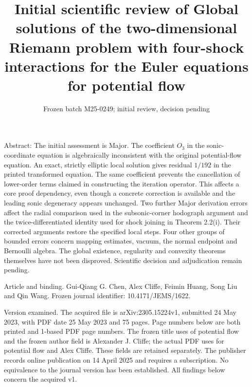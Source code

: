 \documentclass[10pt]{article}
\title{Initial scientific review of
Global solutions of the two-dimensional Riemann problem with four-shock interactions for the Euler equations for potential flow}
\author{}
\date{Frozen batch M25-0249; initial review, decision pending}
\begin{document}
\maketitle
Abstract: The initial assessment is Major. The coefficient \(O_3\) in the sonic-coordinate equation is algebraically inconsistent with the original potential-flow equation. An exact, strictly elliptic local solution gives residual \(1/192\) in the printed transformed equation. The same coefficient prevents the cancellation of lower-order terms claimed in constructing the iteration operator. This affects a core proof dependency, even though a concrete correction is available and the leading sonic degeneracy appears unchanged. Two further Major derivation errors affect the radial comparison used in the subsonic-corner hodograph argument and the twice-differentiated identity used for shock joining in Theorem 2.2(i). Their corrected arguments restore the specified local steps. Four other groups of bounded errors concern mapping estimates, vacuum, the normal endpoint and Bernoulli algebra. The global existence, regularity and convexity theorems themselves have not been disproved. Scientific decision and adjudication remain pending.\par
Article and binding. Gui-Qiang G. Chen, Alex Cliffe, Feimin Huang, Song Liu and Qin Wang. Frozen journal identifier: 10.4171/JEMS/1622.\par
Version examined. The acquired file is arXiv:2305.15224v1, submitted 24 May 2023, with PDF date 25 May 2023 and 75 pages. Page numbers below are both printed and 1-based PDF page numbers. The frozen title uses of potential flow and the frozen author field is Alexander J. Cliffe; the actual PDF uses for potential flow and Alex Cliffe. These fields are retained separately. The publisher records online publication on 14 April 2025 and requires a subscription. No equivalence to the journal version has been established. All findings below concern the acquired v1.\par
\end{document}
